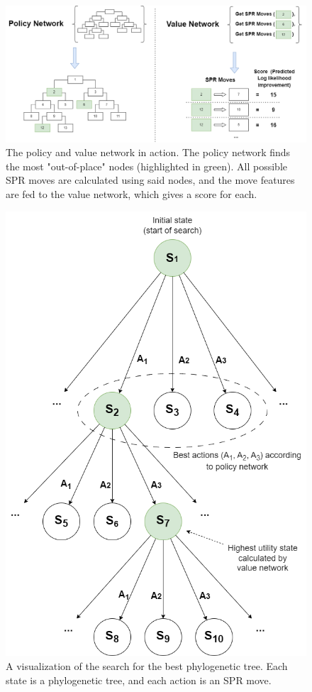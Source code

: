 \documentclass{mpaper}
\begin{document}
\begin{figure}
    \includegraphics[width=1\linewidth]{dissertation/images/neural_algorithm.png}
    \centering
    \caption{The policy and value network in action. The policy network finds the most "out-of-place" nodes (highlighted in green). All possible SPR moves are calculated using said nodes, and the move features are fed to the value network, which gives a score for each.}
\end{figure}


\begin{figure}
    \includegraphics[width=0.8\linewidth]{dissertation/images/algorithm_in_action.png}
    \centering
    \caption{A visualization of the search for the best phylogenetic tree. Each state is a phylogenetic tree, and each action is an SPR move.}
\end{figure}
\end{document}

